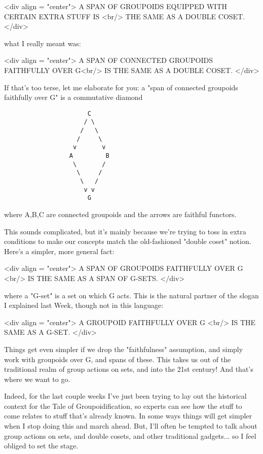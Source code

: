 <div align = "center">
          A SPAN OF GROUPOIDS EQUIPPED WITH CERTAIN EXTRA STUFF IS  <br/>
                      THE SAME AS A DOUBLE COSET.
</div>

what I really meant was:

<div align = "center">
               A SPAN OF CONNECTED GROUPOIDS FAITHFULLY OVER G<br/>
                      IS THE SAME AS A DOUBLE COSET.                      
</div>

If that's too terse, let me elaborate for you: a "span of connected 
groupoids faithfully over G" is a commutative diamond

\begin{verbatim}
                       C
                      / \
                     /   \
                    /     \
                   v       v
                  A         B
                   \       /
                    \     /
                     \   /
                      v v
                       G
\end{verbatim}
    
where A,B,C are connected groupoids and the arrows are faithful
functors.

This sounds complicated, but it's mainly because we're trying to toss
in extra conditions to make our concepts match the old-fashioned "double
coset" notion.  Here's a simpler, more general fact: 

<div align = "center">
                A SPAN OF GROUPOIDS FAITHFULLY OVER G <br/>
                  IS THE SAME AS A SPAN OF G-SETS.
</div>

where a "G-set" is a set on which G acts.  This is the natural partner 
of the slogan I explained last Week, though not in this language:

<div align = "center">
                   A GROUPOID FAITHFULLY OVER G <br/>
                     IS THE SAME AS A G-SET.
</div>

Things get even simpler if we drop the "faithfulness" assumption, and
simply work with groupoids over G, and spans of these.   This takes
us out of the traditional realm of group actions on sets, and into the
21st century!  And that's where we want to go.   

Indeed, for the last couple weeks I've just been trying to lay out the
historical context for the Tale of Groupoidification, so experts can
see how the stuff to come relates to stuff that's already known.  In
some ways things will get simpler when I stop doing this and march
ahead.  But, I'll often be tempted to talk about group actions on
sets, and double cosets, and other traditional gadgets... so I feel
obliged to set the stage.
       
